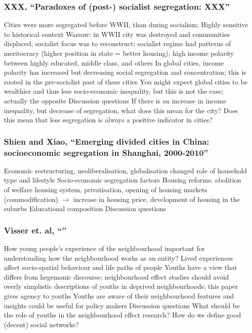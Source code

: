 \documentclass{article}
\begin{document}
\subsubsection{XXX, ``Paradoxes of (post-) socialist segregation: XXX''}
\begin{outline}
	\1 Cities were more segregated before WWII, than during socialism; 
	\1 Highly sensitive to historical context
		\2 Warsaw: in WWII city was destroyed and communities displaced; socialist focus was to reconstruct; socialist regime had patterns of meritocracy (higher position in state = better housing); high income polarity between highly educated, middle class, and others
	\1 In global cities, income polarity has increased but  decreasing social segregation and concentration; this is rooted in the pre-socialist past of these cities
		\2 You might expect global cities to be wealthier and thus less socio-economic inequality, but this is not the case; actually the opposite
	\1 Discussion questions
		\2 If there is an increase in income inequality, but decrease of segregation, what does this mean for the city?
		\2 Does this mean that less segregation is always a positive indicator in cities?
\end{outline}

\subsubsection{Shien and Xiao, ``Emerging divided cities in China: socioeconomic segregation in Shanghai, 2000-2010''}
\begin{outline}
	\1 Economic restructuring, neoliberalisation, globalisation changed role of household type and lifestyle
	\1 	Socio-economic segregation factors
		\2 Housing reforms: abolition of welfare housing system, privatisation, opening of housing markets (commodification) $\rightarrow$ increase in housing price, development of housing in the suburbs
		\2 Educational composition
	\1 Discussion questions
		\2 
\end{outline}


\subsubsection{Visser et. al, ``''}
\begin{outline}
	\1 How young people's experience of the neighbourhood important for understanding how the neighbourhood works as an entity?
		\2 Lived experiences affect socio-spatial behaviour and life paths of people 
		\2 Youths have a view that differs from hegemonic discourse; neighbourhood effect studies should avoid overly simplistic descriptions of youths in deprived neighbourhoods; this paper gives agency to youths 
		\2 Youths are aware of their neighbourhood features and insights could be useful for policy makers
	\1 Discussion questions
		\2 What should be the role of youths in the neighbourhood effect research?
		\2 How do we define good (decent) social networks?
\end{outline}
\end{document}
